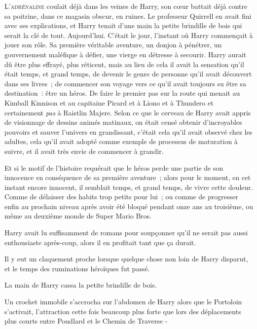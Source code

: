 
\lettrine{L}{'adrénaline} coulait déjà dans les veines de Harry, son cœur battait déjà contre sa poitrine, dans ce magasin obscur, en ruines. Le professeur Quirrell en avait fini avec ses explications, et Harry tenait d'une main la petite brindille de bois qui serait la clé de tout. Aujourd'hui. C'était le jour, l'instant où Harry commençait à jouer son rôle. Sa première véritable aventure, un donjon à pénétrer, un gouvernement maléfique à défier, une vierge en détresse à secourir. Harry aurait dû être plus effrayé, plus réticent, mais au lieu de cela il avait la sensation qu'il était temps, et grand temps, de devenir le genre de personne qu'il avait découvert dans ses livres~; de commencer son voyage vers ce qu'il avait toujours su être sa destination~: être un héros. De faire le premier pas sur la route qui menait au Kimball Kinnison et au capitaine Picard et à Liono et à Thundero et certainement \emph{pas} à Raistlin Majere. Selon ce que le cerveau de Harry avait appris de visionnage de dessins animés matinaux, on était censé obtenir d'incroyables pouvoirs et sauver l'univers en grandissant, c'était cela qu'il avait observé chez les adultes, cela qu'il avait adopté comme exemple de processus de maturation à suivre, et il avait très envie de commencer à grandir.

Et si le motif de l'histoire requérait que le héros perde une partie de son innocence en conséquence de sa première aventure~; alors pour le moment, en cet instant encore innocent, il semblait temps, et grand temps, de vivre cette douleur. Comme de délaisser des habits trop petits pour lui~; ou comme de progresser enfin au prochain niveau après avoir été bloqué pendant onze ans au troisième, ou même au deuxième monde de Super Mario Bros.

Harry avait lu suffisamment de romans pour soupçonner qu'il ne serait pas aussi enthousiaste après-coup, alors il en profitait tant que ça durait.

Il y eut un claquement proche lorsque quelque chose non loin de Harry disparut, et le temps des ruminations héroïques fut passé.

La main de Harry cassa la petite brindille de bois.

Un crochet immobile s'accrocha sur l'abdomen de Harry alors que le Portoloin s'activait, l'attraction cette fois beaucoup plus forte que lors des déplacements plus courts entre Poudlard et le Chemin de Traverse -

